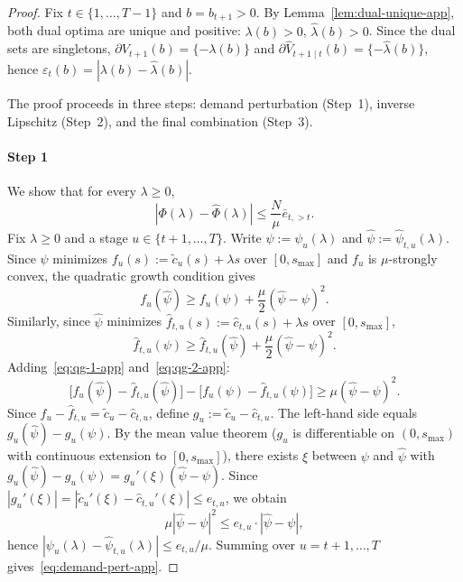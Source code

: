\documentclass{uai2026} %
\newcommand{\1}{\mathbf{1}}
\renewcommand{\epsilon}{\varepsilon}
\newcommand{\subdiff}{\partial}
\begin{document}
\begin{proof}
  Fix $t \in \{1,\dots,T-1\}$ and $b = b_{t+1} > 0$.
  By Lemma~\ref{lem:dual-unique-app}, both dual optima are unique
  and positive: $\lambda(b) > 0$, $\hat{\lambda}(b) > 0$.
  Since the dual sets are singletons,
  $\subdiff V_{t+1}(b)=\{-\lambda(b)\}$
  and $\subdiff\hat{V}_{t+1\mid t}(b)=\{-\hat{\lambda}(b)\}$,
  hence $\epsilon_t(b)=|\lambda(b)-\hat{\lambda}(b)|$.

  The proof proceeds in three steps:
  demand perturbation (Step~1),
  inverse Lipschitz (Step~2),
  and the final combination (Step~3).

  \paragraph{Step 1}
  We show that for every $\lambda \ge 0$,
  \begin{equation}
    \label{eq:demand-pert-app}
    |\Phi(\lambda)-\hat{\Phi}(\lambda)|
    \le \frac{N}{\mu}\bar{e}_{t,>t}.
  \end{equation}
  Fix $\lambda \ge 0$ and a stage $u \in \{t+1,\dots,T\}$.
  Write $\psi := \psi_u(\lambda)$
  and $\hat{\psi} := \hat{\psi}_{t,u}(\lambda)$.
  Since $\psi$ minimizes $f_u(s) := \tilde{c}_u(s)+\lambda s$
  over $[0,s_{\max}]$ and $f_u$ is $\mu$-strongly convex,
  the quadratic growth condition gives
  \begin{equation}
    \label{eq:qg-1-app}
    f_u(\hat{\psi})
    \ge f_u(\psi) + \frac{\mu}{2}(\hat{\psi}-\psi)^{2}.
  \end{equation}
  Similarly, since $\hat{\psi}$ minimizes
  $\hat{f}_{t,u}(s) := \hat{c}_{t,u}(s)+\lambda s$
  over $[0,s_{\max}]$,
  \begin{equation}
    \label{eq:qg-2-app}
    \hat{f}_{t,u}(\psi)
    \ge \hat{f}_{t,u}(\hat{\psi}) + \frac{\mu}{2}(\hat{\psi}-\psi)^{2}.
  \end{equation}
  Adding~\eqref{eq:qg-1-app} and~\eqref{eq:qg-2-app}:
  \begin{equation*}
    \bigl[f_u(\hat{\psi})-\hat{f}_{t,u}(\hat{\psi})\bigr]
    - \bigl[f_u(\psi)-\hat{f}_{t,u}(\psi)\bigr]
    \ge \mu(\hat{\psi}-\psi)^{2}.
  \end{equation*}
  Since $f_u - \hat{f}_{t,u} = \tilde{c}_u - \hat{c}_{t,u}$,
  define $g_u := \tilde{c}_u - \hat{c}_{t,u}$.
  The left-hand side equals $g_u(\hat{\psi})-g_u(\psi)$.
  By the mean value theorem ($g_u$ is differentiable
  on $(0,s_{\max})$ with continuous extension to $[0,s_{\max}]$),
  there exists $\xi$ between $\psi$ and $\hat{\psi}$ with
  $g_u(\hat{\psi})-g_u(\psi) = g_u'(\xi)(\hat{\psi}-\psi)$.
  Since $|g_u'(\xi)| = |\tilde{c}_u'(\xi)-\hat{c}_{t,u}'(\xi)| \le e_{t,u}$,
  we obtain
  \begin{equation*}
    \mu|\hat{\psi}-\psi|^{2}
    \le e_{t,u}\cdot|\hat{\psi}-\psi|,
  \end{equation*}
  hence $|\psi_u(\lambda)-\hat{\psi}_{t,u}(\lambda)|
  \le e_{t,u}/\mu$.
  Summing over $u = t+1,\dots,T$ gives~\eqref{eq:demand-pert-app}.


\end{proof}
\end{document}
